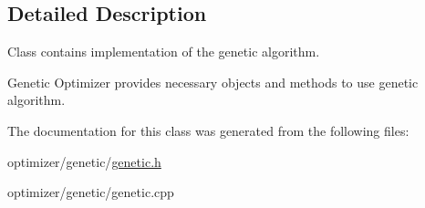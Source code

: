 \subsection{Detailed Description}
Class contains implementation of the genetic algorithm. 

Genetic Optimizer provides necessary objects and methods to use genetic algorithm. 

The documentation for this class was generated from the following files\+:\begin{DoxyCompactItemize}
\item 
optimizer/genetic/\hyperlink{genetic_8h}{genetic.\+h}\item 
optimizer/genetic/genetic.\+cpp\end{DoxyCompactItemize}
